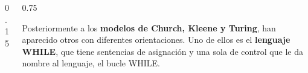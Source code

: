 \documentclass[xcolor=table]{beamer}
\begin{document}
\begin{frame}[fragile]
\begin{columns}
\begin{column}{0.15\textwidth}
\begin{center}
\end{center}

\end{column}

\begin{column}{0.75\textwidth}

Posteriormente a los \textbf{modelos de Church, Kleene y Turing}, han aparecido otros con diferentes orientaciones.  Uno de ellos es el \textbf{lenguaje WHILE}, que tiene sentencias de asignación y una sola de control que le da nombre al lenguaje, el bucle WHILE.


\end{column}
\end{columns}
\hspace{3cm}



\end{frame}
\end{document}
